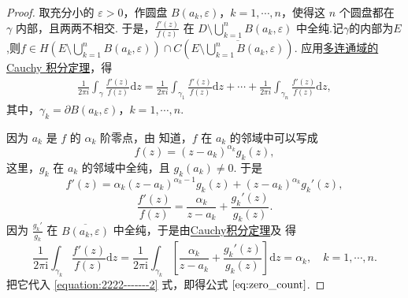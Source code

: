 \documentclass[../../main.tex]{subfiles}
\begin{document}
\begin{proof} 
取充分小的 \( \varepsilon > 0 \)，作圆盘 \( B(a_k, \varepsilon) \)，\( k = 1, \cdots, n \)，使得这 \( n \) 个圆盘都在 \( \gamma \) 内部，且两两不相交. 于是，\( \frac{f'(z)}{f(z)} \) 在 \( D \setminus \bigcup_{k=1}^{n} B(a_k, \varepsilon) \) 中全纯.记$\gamma$的内部为$E$,则$f\in H\left(E\setminus \bigcup_{k=1}^{n} B(a_k, \varepsilon)\right)\cap C\left(\overline{E\setminus \bigcup_{k=1}^{n} B(a_k, \varepsilon)}\right)$. 应用\hyperref[theorem:定理3.2.5]{多连通域的 Cauchy 积分定理}，得
\begin{align}
\frac{1}{2\pi i} \int_{\gamma} \frac{f'(z)}{f(z)} \mathrm{d}z = \frac{1}{2\pi i} \int_{\gamma_1} \frac{f'(z)}{f(z)} \mathrm{d}z + \cdots + \frac{1}{2\pi i} \int_{\gamma_n} \frac{f'(z)}{f(z)} \mathrm{d}z, \label{equation:2222-------2}
\end{align}
其中，\( \gamma_k = \partial B(a_k, \varepsilon) \)，\( k = 1, \cdots, n \).

因为 \( a_k \) 是 \( f \) 的 \( \alpha_k \) 阶零点，由 知道，\( f \) 在 \( a_k \) 的邻域中可以写成
\[
f(z) = (z - a_k)^{\alpha_k} g_k(z),
\]
这里，\( g_k \) 在 \( a_k \) 的邻域中全纯，且 \( g_k(a_k) \neq 0 \). 于是
\[
f'(z) = \alpha_k (z - a_k)^{\alpha_k - 1} g_k(z) + (z - a_k)^{\alpha_k} g_k'(z),
\]
\[
\frac{f'(z)}{f(z)} = \frac{\alpha_k}{z - a_k} + \frac{g_k'(z)}{g_k(z)}.
\]
因为 \( \frac{g_k'}{g_k} \) 在 \( \overline{B(a_k, \varepsilon)} \) 中全纯，于是由\hyperref[theorem:Cauchy-Goursat定理(Cauchy积分定理)]{Cauchy积分定理}及 得
\[
\frac{1}{2\pi \mathrm{i}}\int_{\gamma _k}{\frac{f' (z)}{f(z)}\mathrm{d}z}=\frac{1}{2\pi \mathrm{i}}\int_{\gamma _k}{\left[ \frac{\alpha _k}{z-a_k}+\frac{g_k' (z)}{g_k(z)} \right] \mathrm{d}z}=\alpha _k,\quad k=1,\cdots ,n.
\]
把它代入 \eqref{equation:2222-------2} 式，即得公式 \(\eqref{eq:zero_count}\).
\end{proof}
\end{document}
